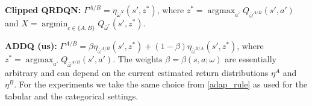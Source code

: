 \documentclass{article}
\theoremstyle{plain}
\theoremstyle{definition}
\theoremstyle{remark}
\begin{document}
   \textbf{Clipped QRDQN:}  $\Gamma^{A/B}=\eta_{\bar\omega^X}(s',z^*)$, where
   $z^*=\operatorname{argmax}_{a'}Q_{\bar\omega^{A/B}}(s',a')$ and $X=\operatorname{argmin}_{c\in\{A,B\}}Q_{\bar\omega^c}(s',z^*)$.  \smallskip




    \textbf{ADDQ (us):} 
$\Gamma^{A/B}=\beta\eta_{\bar\omega^{A/B}}(s',z^*)+(1-\beta)\eta_{\bar\omega^{B/A}}(s',z^*)$,
where $z^*=\operatorname{argmax}_{a'}Q_{\bar\omega^{A/B}}(s',a').$ The weights $\beta=\beta(s,a;\omega)$ are essentially arbitrary and can depend on the current estimated return distributions $\eta^A$ and $\eta^B$. For the experiments we take the same choice from \ref{adap_rule} as used for the tabular and the categorical settings.


\end{document}

